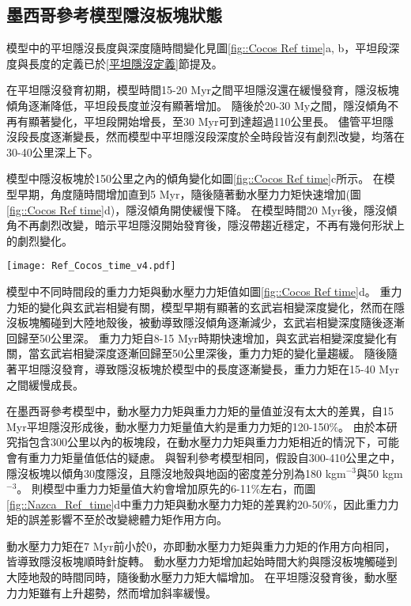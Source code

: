 \subsection{墨西哥參考模型隱沒板塊狀態}
模型中的平坦隱沒長度與深度隨時間變化見圖\ref{fig::Cocos Ref time}a, b，平坦段深度與長度的定義已於\ref{平坦隱沒定義}節提及。

在平坦隱沒發育初期，模型時間15-20 Myr之間平坦隱沒還在緩慢發育，隱沒板塊傾角逐漸降低，平坦段長度並沒有顯著增加。
隨後於20-30 My之間，隱沒傾角不再有顯著變化，平坦段開始增長，至30 Myr可到達超過110公里長。
儘管平坦隱沒段長度逐漸變長，然而模型中平坦隱沒段深度於全時段皆沒有劇烈改變，均落在30-40公里深上下。

模型中隱沒板塊於150公里之內的傾角變化如圖\ref{fig::Cocos Ref time}c所示。
在模型早期，角度隨時間增加直到5 Myr，隨後隨著動水壓力力矩快速增加(圖\ref{fig::Cocos Ref time}d)，隱沒傾角開使緩慢下降。
在模型時間20 Myr後，隱沒傾角不再劇烈改變，暗示平坦隱沒開始發育後，隱沒帶趨近穩定，不再有幾何形狀上的劇烈變化。

\begin{figure*}[hb]
    \centering
    \texttt{[image: Ref\_Cocos\_time\_v4.pdf]}
    \caption[墨西哥參考模型隱沒板塊狀態隨時間變化]{墨西哥參考模型隱沒板塊狀態隨時間變化。灰底為模型中之平坦隱沒時期。(a)參考模型平坦段長度隨時間變化(b)參考模型平坦段深度隨時間變化，灰虛線為\citet{Manea2017}中提及之墨西哥平坦隱沒平坦段深度約落在35公里深。(c)粉紅線為參考模型隱沒板塊自海溝到深度150公里之傾角，黑線則為參考模型隱沒板塊自海溝到深度60公里之傾角。(d)參考模型中重力力矩與動水壓力力矩隨時間變化。其中粉紅色線為重力力矩，深藍色線為動水壓力力矩。兩者皆有做1 Myr的移動平均。灰虛線標示力矩0。}
    \label{fig::Cocos Ref time}
\end{figure*}

模型中不同時間段的重力力矩與動水壓力力矩值如圖\ref{fig::Cocos Ref time}d。
重力力矩的變化與玄武岩相變有關，模型早期有顯著的玄武岩相變深度變化，然而在隱沒板塊觸碰到大陸地殼後，被動導致隱沒傾角逐漸減少，玄武岩相變深度隨後逐漸回歸至50公里深。
重力力矩自8-15 Myr時期快速增加，與玄武岩相變深度變化有關，當玄武岩相變深度逐漸回歸至50公里深後，重力力矩的變化量趨緩。
隨後隨著平坦隱沒發育，導致隱沒板塊於模型中的長度逐漸變長，重力力矩在15-40 Myr之間緩慢成長。

在墨西哥參考模型中，動水壓力力矩與重力力矩的量值並沒有太大的差異，自15 Myr平坦隱沒形成後，動水壓力力矩量值大約是重力力矩的120-150$\%$。
由於本研究指包含300公里以內的板塊段，在動水壓力力矩與重力力矩相近的情況下，可能會有重力力矩量值低估的疑慮。
與智利參考模型相同，假設自300-410公里之中，隱沒板塊以傾角30度隱沒，且隱沒地殼與地函的密度差分別為180 kgm$^{-3}$與50 kgm$^{-3}$。
則模型中重力力矩量值大約會增加原先的6-11$\%$左右，而圖\ref{fig::Nazca_Ref_time}d中重力力矩與動水壓力力矩的差異約20-50$\%$，因此重力力矩的誤差影響不至於改變總體力矩作用方向。

動水壓力力矩在7 Myr前小於0，亦即動水壓力力矩與重力力矩的作用方向相同，皆導致隱沒板塊順時針旋轉。
動水壓力力矩增加起始時間大約與隱沒板塊觸碰到大陸地殼的時間同時，隨後動水壓力力矩大幅增加。
在平坦隱沒發育後，動水壓力力矩雖有上升趨勢，然而增加斜率緩慢。
